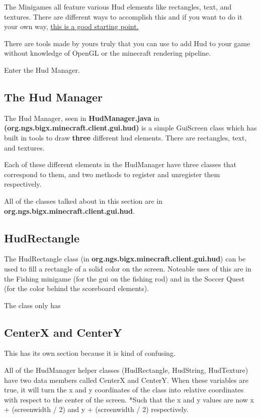 \documentclass[12pt]{article}
\begin{document}
The Minigames all feature various Hud elements like rectangles, text, and textures. There are different ways to accomplish this and if you want to do it your own way, \href {https://jabelarminecraft.blogspot.com/p/minecraft-modding-block-with-simple-gui.html}{this is a good starting point.}

There are tools made by yours truly that you can use to add Hud to your game without knowledge of OpenGL or the minecraft rendering pipeline.

Enter the Hud Manager.

\subsection{The Hud Manager}

The Hud Manager, seen in {\bfseries HudManager.java} in {\bfseries (org.ngs.bigx.minecraft.client.gui.hud)} is a simple GuiScreen class which has built in tools to draw {\bfseries three} different hud elements. There are rectangles, text, and textures.

Each of these different elements in the HudManager have three classes that correspond to them, and two methods to register and unregister them respectively.

All of the classes talked about in this section are in {\bfseries org.ngs.bigx.minecraft.client.gui.hud}.

\subsection{HudRectangle}

The HudRectangle class (in {\bfseries org.ngs.bigx.minecraft.client.gui.hud}) can be used to fill a rectangle of a solid color on the screen. Noteable uses of this are in the Fishing minigame (for the gui on the fishing rod) and in the Soccer Quest (for the color behind the scoreboard elements).

The class only has 

\subsection{CenterX and CenterY}

This has its own section because it is kind of confusing.

All of the HudManager helper classes (HudRectangle, HudString, HudTexture) have two data members called CenterX and CenterY. When these variables are true, it will turn the x and y coordinates of the class into {\emph relative} coordinates with respect to the center of the screen. *Such that the x and y values are now x + (screenwidth / 2) and y + (screenwidth / 2) respectively.
\end{document}

